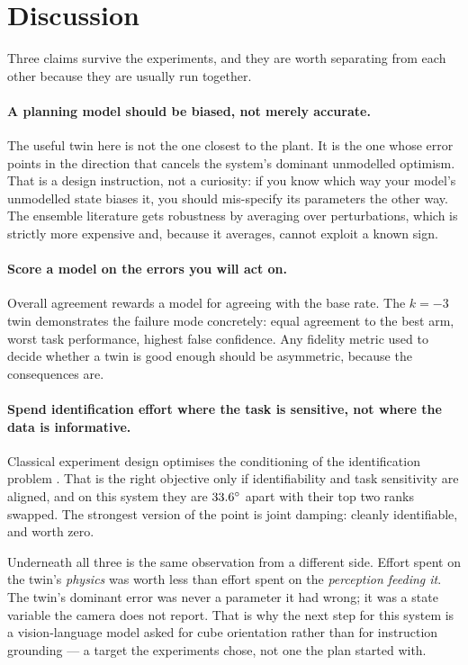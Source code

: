 \documentclass[11pt,a4paper]{article}
\begin{document}
\section{Discussion}

Three claims survive the experiments, and they are worth separating from each
other because they are usually run together.

\paragraph{A planning model should be biased, not merely accurate.}
The useful twin here is not the one closest to the plant. It is the one whose
error points in the direction that cancels the system's dominant unmodelled
optimism. That is a design instruction, not a curiosity: if you know which way
your model's unmodelled state biases it, you should mis-specify its parameters
the other way. The ensemble literature \citep{mordatch2015ensemble,
rajeswaran2017epopt} gets robustness by averaging over perturbations, which is
strictly more expensive and, because it averages, cannot exploit a known sign.

\paragraph{Score a model on the errors you will act on.}
Overall agreement rewards a model for agreeing with the base rate. The $k=-3$
twin demonstrates the failure mode concretely: equal agreement to the best arm,
worst task performance, highest false confidence. Any fidelity metric used to
decide whether a twin is good enough should be asymmetric, because the
consequences are.

\paragraph{Spend identification effort where the task is sensitive, not where
the data is informative.} Classical experiment design optimises the conditioning
of the identification problem \citep{gautier1992exciting,pukelsheim1993optimal}.
That is the right objective only if identifiability and task sensitivity are
aligned, and on this system they are $33.6^\circ$ apart with their top
two ranks swapped. The strongest version of the point is joint damping: cleanly
identifiable, and worth zero.

Underneath all three is the same observation from a different side. Effort spent
on the twin's \emph{physics} was worth less than effort spent on the
\emph{perception feeding it}. The twin's dominant error was never a parameter it
had wrong; it was a state variable the camera does not report. That is why the
next step for this system is a vision-language model asked for cube orientation
rather than for instruction grounding --- a target the experiments chose, not one
the plan started with.
\end{document}
